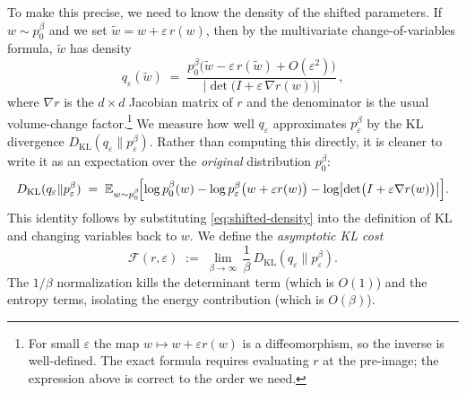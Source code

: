 \documentclass[11pt]{article}
\newcommand{\E}{\mathbb{E}}
\begin{document}
To make this precise, we need to know the density of the shifted parameters. If $w\sim p_0^\beta$ and we set $\tilde w = w + \varepsilon\,r(w)$, then by the multivariate change-of-variables formula, $\tilde w$ has density
\begin{equation}\label{eq:shifted-density}
  q_\varepsilon(\tilde w) \;=\; \frac{p_0^\beta\bigl(\tilde w - \varepsilon\,r(\tilde w) + O(\varepsilon^2)\bigr)}{\bigl|\det\bigl(I + \varepsilon\,\nabla r(w)\bigr)\bigr|}\,,
\end{equation}
where $\nabla r$ is the $d\times d$ Jacobian matrix of $r$ and the denominator is the usual volume-change factor.\footnote{For small $\varepsilon$ the map $w\mapsto w+\varepsilon r(w)$ is a diffeomorphism, so the inverse is well-defined. The exact formula requires evaluating $r$ at the pre-image; the expression above is correct to the order we need.} We measure how well $q_\varepsilon$ approximates $p_\varepsilon^\beta$ by the KL divergence $D_{\mathrm{KL}}(q_\varepsilon\|p_\varepsilon^\beta)$. Rather than computing this directly, it is cleaner to write it as an expectation over the \emph{original} distribution $p_0^\beta$:
\begin{equation}\label{eq:kl-expectation}
  D_{\mathrm{KL}}(q_\varepsilon\|p_\varepsilon^\beta) \;=\; \E_{w\sim p_0^\beta}\!\Bigl[\log p_0^\beta(w) - \log p_\varepsilon^\beta\bigl(w + \varepsilon r(w)\bigr) - \log\bigl|\det\bigl(I + \varepsilon\nabla r(w)\bigr)\bigr|\Bigr].
\end{equation}
This identity follows by substituting \eqref{eq:shifted-density} into the definition of KL and changing variables back to $w$. We define the \emph{asymptotic KL cost}
\begin{equation}\label{eq:ot-cost}
  \mathcal{F}(r,\varepsilon) \;:=\; \lim_{\beta\to\infty}\,\frac{1}{\beta}\,D_{\mathrm{KL}}(q_\varepsilon\|p_\varepsilon^\beta).
\end{equation}
The $1/\beta$ normalization kills the determinant term (which is $O(1)$) and the entropy terms, isolating the energy contribution (which is $O(\beta)$).
\end{document}
